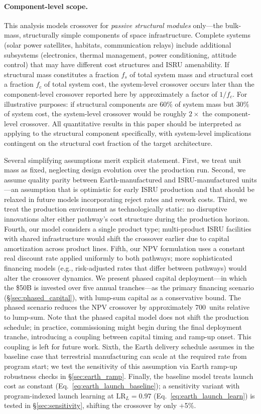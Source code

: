 \documentclass[preprint,12pt]{elsarticle}
\begin{document}
\paragraph{Component-level scope.} This analysis models crossover for \emph{passive structural modules} only---the bulk-mass, structurally simple components of space infrastructure. Complete systems (solar power satellites, habitats, communication relays) include additional subsystems (electronics, thermal management, power conditioning, attitude control) that may have different cost structures and ISRU amenability. If structural mass constitutes a fraction $f_s$ of total system mass and structural cost a fraction $f_c$ of total system cost, the system-level crossover occurs later than the component-level crossover reported here by approximately a factor of $1/f_c$. For illustrative purposes: if structural components are 60\% of system mass but 30\% of system cost, the system-level crossover would be roughly $2\times$ the component-level crossover. All quantitative results in this paper should be interpreted as applying to the structural component specifically, with system-level implications contingent on the structural cost fraction of the target architecture.

Several simplifying assumptions merit explicit statement. First, we treat unit mass as fixed, neglecting design evolution over the production run. Second, we assume quality parity between Earth-manufactured and ISRU-manufactured units---an assumption that is optimistic for early ISRU production and that should be relaxed in future models incorporating reject rates and rework costs. Third, we treat the production environment as technologically static: no disruptive innovations alter either pathway's cost structure during the production horizon. Fourth, our model considers a single product type; multi-product ISRU facilities with shared infrastructure would shift the crossover earlier due to capital amortization across product lines. Fifth, our NPV formulation uses a constant real discount rate applied uniformly to both pathways; more sophisticated financing models (e.g., risk-adjusted rates that differ between pathways) would alter the crossover dynamics. We present phased capital deployment---in which the \$50B is invested over five annual tranches---as the primary financing scenario (\S\ref{sec:phased_capital}), with lump-sum capital as a conservative bound. The phased scenario reduces the NPV crossover by approximately 700~units relative to lump-sum. Note that the phased capital model does not shift the production schedule; in practice, commissioning might begin during the final deployment tranche, introducing a coupling between capital timing and ramp-up onset. This coupling is left for future work. Sixth, the Earth delivery schedule assumes in the baseline case that terrestrial manufacturing can scale at the required rate from program start; we test the sensitivity of this assumption via Earth ramp-up robustness checks in \S\ref{sec:earth_ramp}. Finally, the baseline model treats launch cost as constant (Eq.~\ref{eq:earth_launch_baseline}); a sensitivity variant with program-indexed launch learning at $\mathrm{LR}_L = 0.97$ (Eq.~\ref{eq:earth_launch_learn}) is tested in \S\ref{sec:sensitivity}, shifting the crossover by only $+$5\%.
\end{document}
